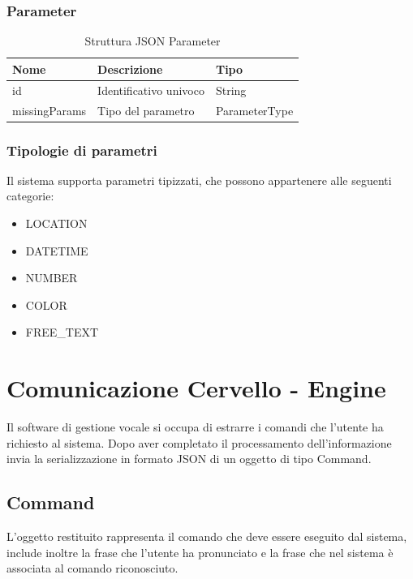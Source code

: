 \documentclass[twoside]{supsistudent}
\begin{document}
\subsection{Parameter}
\begin{table}[H]
\centering
\caption{Struttura JSON Parameter}
\label{Struttura JSON Parameter}
\begin{tabular}{@{}|l|l|l|@{}}
\toprule
Nome & Descrizione            & Tipo          \\ \midrule
id   & Identificativo univoco & String        \\ \midrule
missingParams & Tipo del parametro     & ParameterType \\ \bottomrule
\end{tabular}
\end{table}

\subsection{Tipologie di parametri}
Il sistema supporta parametri tipizzati, che possono appartenere alle seguenti categorie:
\begin{itemize}
	\item LOCATION
	\item DATETIME
	\item NUMBER
	\item COLOR
	\item FREE\_TEXT
\end{itemize}

\chapter{Comunicazione Cervello - Engine }
Il software di gestione vocale si occupa di estrarre i comandi che l'utente ha richiesto al sistema. Dopo aver completato il processamento dell'informazione invia la serializzazione in formato JSON di un oggetto di tipo Command.
\section{Command}
L'oggetto restituito rappresenta il comando che deve essere eseguito dal sistema, include inoltre la frase che l'utente ha pronunciato e la frase che nel sistema è associata al comando riconosciuto.
\end{document}
